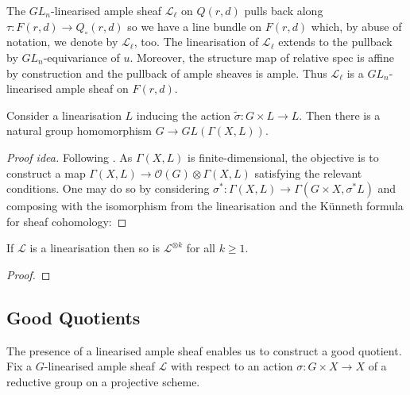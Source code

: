 \documentclass[12pt]{ociamthesis}  %
\begin{document}
\begin{example}
  The $GL_n$-linearised ample sheaf $\mathscr L_\ell$ on
  $Q(r,d)$ pulls back along $\tau:F(r,d)\to Q_\circ(r,d)$ so
  we have a line bundle on $F(r,d)$ which, by abuse of
  notation, we denote by $\mathscr L_\ell$, too. The
  linearisation of $\mathscr L_\ell$ extends to the pullback by
  $GL_n$-equivariance of $u$. Moreover, the structure
  map of relative spec is affine by construction and the
  pullback of ample sheaves is ample. Thus $\mathscr L_\ell$
  is a $GL_n$-linearised ample sheaf on $F(r,d)$.
\end{example}

\begin{lemma}\label{lem:linearisations_give_reps}
  Consider a linearisation $L$ inducing the action
  $\tilde\sigma : G\times L\to L$.
  Then there is a natural group homomorphism $G\to GL(\Gamma(X,L))$.
  \begin{proof}[Proof idea]
    Following \cite[Lemma 5.19]{hoskins2016}. As $\Gamma(X,L)$
    is finite-dimensional, the objective is to construct a map
    $\Gamma(X,L) \to \mathscr O(G) \otimes \Gamma(X,L)$
    satisfying the relevant conditions. One may do so by considering
    $\sigma^* : \Gamma(X,L) \to \Gamma(G\times X,\sigma^*L)$ and
    composing with the isomorphism from the linearisation and
    the K\"unneth formula for sheaf cohomology: 
  \end{proof}
\end{lemma}

\begin{lemma}
  If $\mathscr L$ is a linearisation then so is $\mathscr L^{\otimes k}$
  for all $k\geq 1$.
  \begin{proof}
    \missingproof
  \end{proof}
\end{lemma}

\subsection{Good Quotients}

The presence of a linearised ample sheaf enables us to construct a good
quotient.  Fix a $G$-linearised ample sheaf $\mathscr L$ with respect to an
action $\sigma : G\times X\to X$ of a reductive group on a projective scheme.
\end{document}
